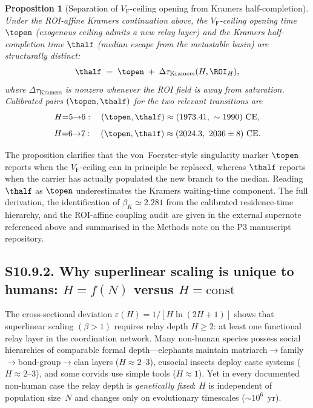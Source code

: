 \documentclass[11pt]{article}
\newtheorem{proposition}{Proposition}
\newcommand{\VF}{V_{\mathrm{F}}}
\begin{document}
\begin{proposition}[Separation of $\VF$-ceiling opening from Kramers half-completion]\label{prop:topen_thalf}
Under the ROI-affine Kramers continuation above, the $\VF$-ceiling opening time $\topen$ (exogenous ceiling admits a new relay layer) and the Kramers half-completion time $\thalf$ (median escape from the metastable basin) are structurally distinct:
\[
\thalf \;=\; \topen \;+\; \Delta\tau_{\mathrm{Kramers}}(H,\ROI_H),
\]
where $\Delta\tau_{\mathrm{Kramers}}$ is nonzero whenever the ROI field is away from saturation.
Calibrated pairs $(\topen,\thalf)$ for the two relevant transitions are
\[
H{=}5{\to}6:\quad (\topen,\thalf)\approx(1973.41,\ \sim 1990)\ \mathrm{CE},
\]
\[
H{=}6{\to}7:\quad (\topen,\thalf)\approx(2024.3,\ 2036\pm 8)\ \mathrm{CE}.
\]
\end{proposition}

\noindent
The proposition clarifies that the von~Foerster-style singularity marker $\topen$ reports when the $\VF$-ceiling can in principle be replaced, whereas $\thalf$ reports when the carrier has actually populated the new branch to the median.  Reading $\thalf$ as $\topen$ underestimates the Kramers waiting-time component.  The full derivation, the identification of $\beta_K\simeq 2.281$ from the calibrated residence-time hierarchy, and the ROI-affine coupling audit are given in the external supernote referenced above and summarised in the Methods note on the P3 manuscript repository.

\subsection*{S10.9.2. Why superlinear scaling is unique to humans: $H = f(N)$ versus $H = \mathrm{const}$}
\label{subsec:S10_9_2_H_dynamic_vs_const}


The cross-sectional deviation $\varepsilon(H) = 1/[H\ln(2H+1)]$ shows that
superlinear scaling $(\beta > 1)$ requires relay depth $H \ge 2$: at least
one functional relay layer in the coordination network.  Many non-human
species possess social hierarchies of comparable formal depth---elephants
maintain matriarch$\to$family$\to$bond-group$\to$clan layers ($H \approx 2$--$3$),
eusocial insects deploy caste systems ($H \approx 2$--$3$), and some
corvids use simple tools ($H \approx 1$).  Yet in every documented
non-human case the relay depth is \emph{genetically fixed}: $H$ is
independent of population size~$N$ and changes only on evolutionary
timescales ($\sim 10^6$~yr).
\end{document}

